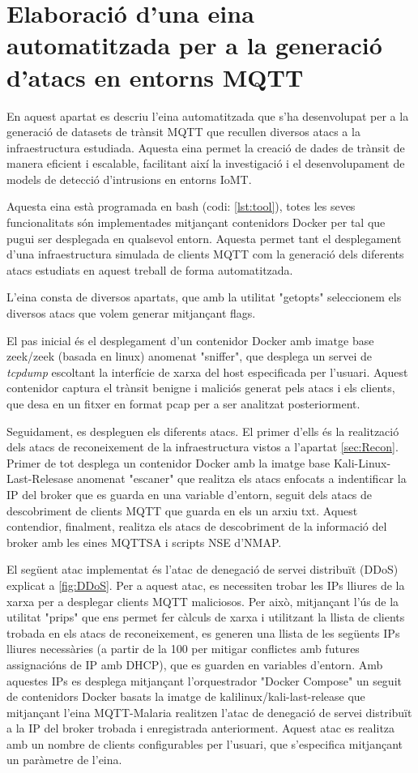 \chapter{Elaboració d'una eina automatitzada per a la generació d'atacs en entorns MQTT}
\label{sec:tool}
En aquest apartat es descriu l'eina automatitzada que s'ha desenvolupat per a la generació de datasets de trànsit MQTT que recullen diversos atacs a la infraestructura estudiada. Aquesta eina permet la creació de dades de trànsit de manera eficient i escalable, facilitant així la investigació i el desenvolupament de models de detecció d'intrusions en entorns IoMT.

Aquesta eina està programada en bash (codi: \ref{lst:tool}), totes les seves funcionalitats són implementades mitjançant contenidors Docker per tal que pugui ser desplegada en qualsevol entorn. Aquesta permet tant el desplegament d'una infraestructura simulada de clients MQTT com la generació dels diferents atacs estudiats en aquest treball de forma automatitzada.

L'eina consta de diversos apartats, que amb la utilitat "getopts" seleccionem els diversos atacs que volem generar mitjançant flags.

El pas inicial és el desplegament d'un contenidor Docker amb imatge base zeek/zeek (basada en linux) \cite{zeekimg} anomenat "sniffer", que desplega un servei de \textit{tcpdump} escoltant la interfície de xarxa del host especificada per l'usuari. Aquest contenidor captura el trànsit benigne i maliciós generat pels atacs i els clients, que desa en un fitxer en format pcap per a ser analitzat posteriorment.

Seguidament, es despleguen els diferents atacs. El primer d'ells és la realització dels atacs de reconeixement de la infraestructura vistos a l'apartat \ref{sec:Recon}. Primer de tot desplega un contenidor Docker amb la imatge base Kali-Linux-Last-Relesase anomenat "escaner" que realitza els atacs enfocats a indentificar la IP del broker que es guarda en una variable d'entorn, seguit dels atacs de descobriment de clients MQTT que guarda en els un arxiu txt. Aquest contendior, finalment, realitza els atacs de descobriment de la informació del broker amb les eines MQTTSA i scripts NSE d'NMAP.

El següent atac implementat és l'atac de denegació de servei distribuït (DDoS) explicat a \ref{fig:DDoS}. Per a aquest atac, es necessiten trobar les IPs lliures de la xarxa per a desplegar clients MQTT maliciosos. Per això, mitjançant l'ús de la utilitat "prips" que ens permet fer càlculs de xarxa i utilitzant la llista de clients trobada en els atacs de reconeixement, es generen una llista de les següents IPs lliures necessàries (a partir de la 100 per mitigar conflictes amb futures assignacións de IP amb DHCP), que es guarden en variables d'entorn. Amb aquestes IPs es desplega mitjançant l'orquestrador "Docker Compose" un seguit de contenidors Docker basats la imatge de kalilinux/kali-last-release que mitjançant l'eina MQTT-Malaria realitzen l'atac de denegació de servei distribuït a la IP del broker trobada i enregistrada anteriorment. Aquest atac es realitza amb un nombre de clients configurables per l'usuari, que s'especifica mitjançant un paràmetre de l'eina.

